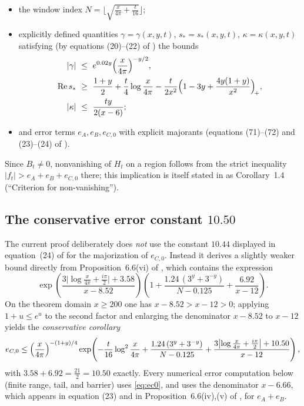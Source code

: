 \documentclass[11pt]{article}
\theoremstyle{definition}
\DeclareMathOperator{\Rea}{Re}
\begin{document}
\begin{itemize}
\item the window index
$N=\bigl\lfloor\sqrt{\tfrac{x}{4\pi}+\tfrac{t}{16}}\bigr\rfloor$;
\item explicitly defined quantities $\gamma=\gamma(x,y,t)$,
$s_*=s_*(x,y,t)$, $\kappa=\kappa(x,y,t)$ satisfying (by equations
(20)--(22) of \cite{Polymath}) the bounds
\begin{align}
|\gamma|&\ \le\ e^{0.02y}\Bigl(\frac{x}{4\pi}\Bigr)^{-y/2},
\label{eq:gammabound}\\
\Rea s_*&\ \ge\ \frac{1+y}{2}+\frac t4\log\frac{x}{4\pi}
-\frac{t}{2x^2}\Bigl(1-3y+\frac{4y(1+y)}{x^2}\Bigr)_{\!+},
\label{eq:resbound}\\
|\kappa|&\ \le\ \frac{ty}{2(x-6)};
\label{eq:kappabound}
\end{align}
\item and error terms $e_A,e_B,e_{C,0}$ with explicit majorants
(equations (71)--(72) and (23)--(24) of \cite{Polymath}).
\end{itemize}
Since $B_t\ne0$, nonvanishing of $H_t$ on a region follows from the
strict inequality $|f_t|>e_A+e_B+e_{C,0}$ there; this implication is
itself stated in \cite{Polymath} as Corollary~1.4 (``Criterion for
non-vanishing'').

\subsection{The conservative error constant $10.50$}\label{sec:weld}

The current proof deliberately does \emph{not} use the constant $10.44$
displayed in equation~(24) of \cite{Polymath} for the majorization of
$e_{C,0}$.
Instead it derives a
slightly weaker bound directly from Proposition~6.6(vi) of
\cite{Polymath}, which contains the expression
\[
\exp\!\left(\frac{3\bigl|\log\frac{x}{4\pi}+\frac{i\pi}2\bigr|+3.58}{x-8.52}\right)
\left(1+\frac{1.24\,(3^y+3^{-y})}{N-0.125}+\frac{6.92}{x-12}\right).
\]
On the theorem domain $x\ge200$ one has $x-8.52>x-12>0$; applying
$1+u\le e^u$ to the second factor and enlarging the denominator
$x-8.52$ to $x-12$ yields the \emph{conservative corollary}
\begin{equation}\label{eq:ec0}
e_{C,0}\le
\Bigl(\frac{x}{4\pi}\Bigr)^{-(1+y)/4}
\exp\!\left(
-\frac{t}{16}\log^2\frac{x}{4\pi}
+\frac{1.24\,(3^y+3^{-y})}{N-0.125}
+\frac{3\bigl|\log\frac{x}{4\pi}+\frac{i\pi}2\bigr|+10.50}{x-12}
\right),
\end{equation}
with $3.58+6.92=\tfrac{21}2=10.50$ exactly. Every numerical error
computation below (finite range, tail, and barrier) uses
\eqref{eq:ec0}, and uses the denominator $x-6.66$, which appears in
equation (23) and in Proposition~6.6(iv),(v) of \cite{Polymath}, for
$e_A+e_B$.
\end{document}
